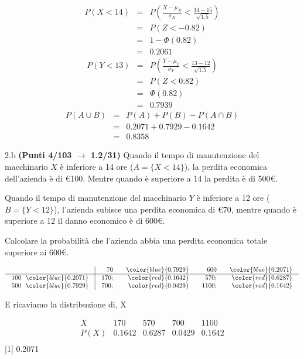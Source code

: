 \documentclass[
  11pt,
]{book}
\theoremstyle{mytheoremstyle}
\theoremstyle{mydefstyle}
\newenvironment{sol}
  {
  \begin{tcolorbox}[enhanced,breakable,arc=0.1mm,boxrule=1pt,colback=white,colframe=iblue,
  title=\bf \fontfamily{lmss}\selectfont \hspace{.5 cm} Soluzione,drop fuzzy shadow]

}{
\end{tcolorbox}
  }
\begin{document}
\begin{sol}
\begin{eqnarray*}
      P( X   <   14 ) 
        &=& P\left(  \frac { X  -  \mu_X }{ \sigma_X }  <  \frac { 14  -  15 }{\sqrt{ 1.5 }} \right)  \\
                 &=& P\left(  Z   <   -0.82 \right) \\    
                 &=&  1-\Phi( 0.82 ) \\ &=&  0.2061 
      \end{eqnarray*}\begin{eqnarray*}
      P( Y   <   13 ) 
        &=& P\left(  \frac { Y  -  \mu_Y }{ \sigma_Y }  <  \frac { 13  -  12 }{\sqrt{ 1.5 }} \right)  \\
                 &=& P\left(  Z   <   0.82 \right) \\    
                 &=&  \Phi( 0.82 ) \\ &=&  0.7939 
      \end{eqnarray*}
\begin{eqnarray*}
  P(A\cup B) &=&  P(A)+P(B)-P(A\cap B)\\
  &=& 0.2071+0.7929-0.1642\\
  &=& 0.8358
\end{eqnarray*}

\end{sol}

2.b \textbf{(Punti 4/103 \(\rightarrow\) 1.2/31)} Quando il tempo di manutenzione del macchinario \(X\) è inferiore a 14 ore (\(A=\{X< 14\}\)), la perdita economica dell'azienda è di €100. Mentre quando è superiore a 14 la perdita è di 500€.

Quando il tempo di manutenzione del macchinario \(Y\) è inferiore a 12 ore (\(B=\{Y< 12\}\)), l'azienda subisce una perdita economica di €70, mentre quando è superiore a 12 il danno economico è di 600€.

Calcolare la probabilità che l'azienda abbia una perdita economica totale superiore ai 600€.

\begin{sol}

\normalsize

\[\arraycolsep=10pt\def\arraystretch{1}\begin{array}{ r|rrrr }
& 70 &\color{blue}{ 0.7929 } & 600 &\color{blue}{ 0.2071 }\\ \hline 
100 ~~\color{blue}{ 0.2071 }& 170;& \color{red}{0.1642}& 570;& \color{red}{0.6287}\\ 
500 ~~\color{blue}{ 0.7929 }& 700;& \color{red}{0.0429}& 1100;& \color{red}{0.1642}\\ 
\end{array}
 \]

\normalsize E ricaviamo la distribuzione di, X

\normalsize

\[
     \begin{array}{ r|rrrr }
 X & 170& 570& 700& 1100 \\ 
 \hline 
 P(X) & 0.1642& 0.6287& 0.0429& 0.1642 \\ 
 \end{array}
 \]
{[}1{]} 0.2071

\end{sol}
\end{document}
